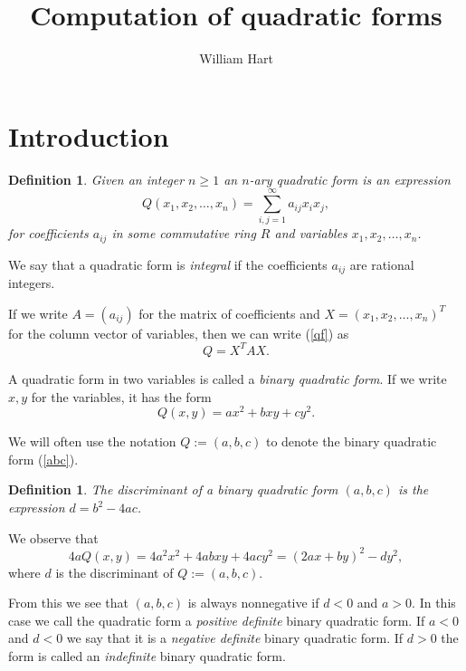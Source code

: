 \documentclass[a4paper,10pt]{amsart}
\title{Computation of quadratic forms}
\author{William Hart}
\newtheorem{definition}[theorem]{Definition}
\begin{document}
\maketitle

\section{Introduction}

\begin{definition}
Given an integer $n \geq 1$ an \emph{$n$-ary quadratic form} is an expression
\begin{equation}\label{qf}
Q(x_1, x_2, \ldots, x_n) = \sum_{i,j=1}^{\infty} a_{ij}x_ix_j,
\end{equation}
for coefficients $a_{ij}$ in some commutative ring $R$ and variables $x_1, x_2, \ldots, x_n$.
\end{definition}

We say that a quadratic form is \emph{integral} if the coefficients $a_{ij}$ are rational integers.

If we write $A = (a_{ij})$ for the matrix of coefficients and $X = (x_1, x_2, \ldots, x_n)^T$ for the column vector of variables, then we can write (\ref{qf}) as
\begin{equation}
Q = X^TAX.
\end{equation}

A quadratic form in two variables is called a \emph{binary quadratic form}. If we write $x, y$ for the variables, it has the form
\begin{equation}\label{abc}
Q(x, y) = ax^2 + bxy + cy^2.
\end{equation}

We will often use the notation $Q := (a, b, c)$ to denote the binary quadratic form (\ref{abc}).

\begin{definition}
The \emph{discriminant} of a binary quadratic form $(a, b, c)$ is the expression $d = b^2 - 4ac$.
\end{definition}

We observe that 
\begin{equation}
4aQ(x, y) = 4a^2x^2 + 4abxy + 4acy^2 = (2ax + by)^2 - dy^2,
\end{equation}
where $d$ is the discriminant of $Q := (a, b, c)$.

From this we see that $(a, b, c)$ is always nonnegative if $d < 0$ and $a > 0$. In this case we call the quadratic form a \emph{positive definite} binary quadratic form. If $a < 0$ and $d < 0$ we say that it is a \emph{negative definite} binary quadratic form. If $d > 0$ the form is called an \emph{indefinite} binary quadratic form.
\end{document}

